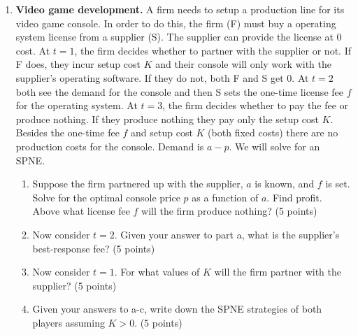 \documentclass{article}
\begin{document}
\begin{enumerate}
\begin{enumerate}
\vspace{4cm}
    

     \end{enumerate}
     
      \item \textbf{Video game development.} A firm needs to setup a production line for its video game console. In order to do this, the firm (F) must buy a operating system license from a supplier (S). The supplier can provide the license at 0 cost. At $t=1$, the firm decides whether to partner with the supplier or not. If F does, they incur setup cost $K$ and their console will only work with the supplier's operating software. If they do not, both F and S get $0$. At $t=2$ both see the demand for the console and then S sets the one-time license fee $f$ for the operating system. At $t=3$, the firm decides whether to pay the fee or produce nothing. If they produce nothing they pay only the setup cost $K$. Besides the one-time fee $f$ and setup cost $K$ (both fixed costs) there are no production costs for the console. Demand is $a-p$. We will solve for an SPNE.
      
      \pagebreak
      
      \begin{enumerate}
          \item Suppose the firm partnered up with the supplier, $a$ is known, and $f$ is set. Solve for the optimal console price $p$ as a function of $a$. Find profit. Above what license fee $f$ will the firm produce nothing? (5 points)
          
       \vspace{6cm}
       
          \item Now consider $t=2$. Given your answer to part a, what is the supplier's best-response fee? (5 points)
          
          \vspace{3cm}
          
          

          \item Now consider $t=1$. For what values of $K$ will the firm partner with the supplier? (5 points)
          
          \vspace{4cm}
           
          \item Given your answers to a-c, write down the SPNE strategies of both players assuming $K>0$.  (5 points)
          

\end{enumerate}
\end{enumerate}
\end{document}
